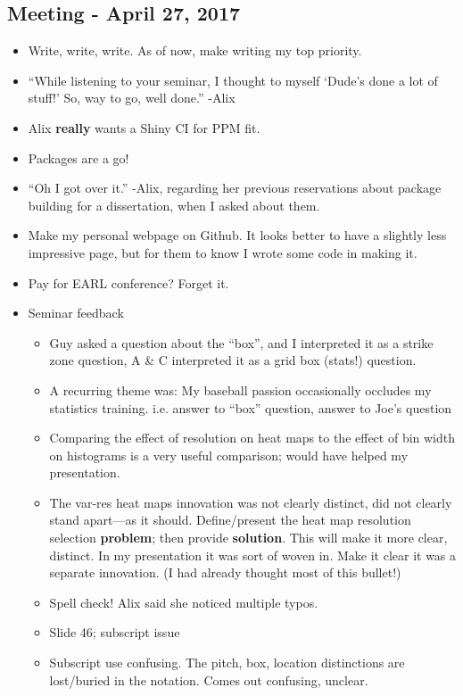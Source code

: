 \documentclass{article}
\begin{document}
\subsection*{Meeting - April 27, 2017}
\begin{itemize}
\item Write, write, write. As of now, make writing my top priority.
\item ``While listening to your seminar, I thought to myself `Dude's done a lot of stuff!' So, way to go, well done.'' -Alix
\item Alix {\bf really} wants a Shiny CI for PPM fit.
\item Packages are a go!
\item ``Oh I got over it.'' -Alix, regarding her previous reservations about package building for a dissertation, when I asked about them.
\item Make my personal webpage on Github. It looks better to have a slightly less impressive page, but for them to know I wrote some code in making it.
\item Pay for EARL conference? Forget it.
\item Seminar feedback
  \begin{itemize}
  \item Guy asked a question about the ``box'', and I interpreted it as a strike zone question, A \& C interpreted it as a grid box (stats!) question.
  \item A recurring theme was: My baseball passion occasionally occludes my statistics training. i.e. answer to ``box'' question, answer to Joe's question
  \item Comparing the effect of resolution on heat maps to the effect of bin width on histograms is a very useful comparison; would have helped my presentation.
  \item The var-res heat maps innovation was not clearly distinct, did not clearly stand apart---as it should. Define/present the heat map resolution selection {\bf problem}; then provide {\bf solution}. This will make it more clear, distinct. In my presentation it was sort of woven in. Make it clear it was a separate innovation. (I had already thought most of this bullet!)
  \item Spell check! Alix said she noticed multiple typos.
  \item Slide 46; subscript issue
  \item Subscript use confusing. The pitch, box, location distinctions are lost/buried in the notation. Comes out confusing, unclear.

\end{itemize}
\end{itemize}
\end{document}
